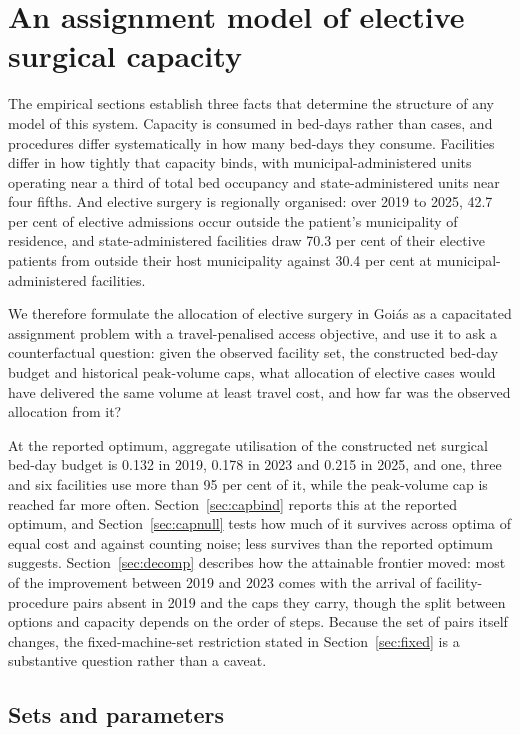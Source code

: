 \section{An assignment model of elective surgical capacity}
\label{sec:model}

The empirical sections establish three facts that determine the structure of any
model of this system. Capacity is consumed in bed-days rather than cases, and
procedures differ systematically in how many bed-days they consume. Facilities
differ in how tightly that capacity binds, with municipal-administered units
operating near a third of total bed occupancy and state-administered units near
four fifths. And elective surgery is regionally organised: over 2019 to 2025, 42.7 per cent of elective admissions occur outside the patient's municipality of residence, and
state-administered facilities draw 70.3 per cent of their elective patients from
outside their host municipality against 30.4 per cent at municipal-administered
facilities.

We therefore formulate the allocation of elective surgery in Goi\'as as a
capacitated assignment problem with a travel-penalised access objective, and use
it to ask a counterfactual question: given the observed facility set, the constructed bed-day budget and historical peak-volume caps, what allocation of elective cases would have
delivered the same volume at least travel cost, and how far was the observed
allocation from it?

At the reported optimum, aggregate utilisation of the constructed net surgical
bed-day budget is 0.132 in 2019, 0.178 in 2023 and 0.215 in 2025, and one, three
and six facilities use more than 95 per cent of it, while the peak-volume cap is
reached far more often. Section~\ref{sec:capbind} reports this at the reported
optimum, and Section~\ref{sec:capnull} tests how much of it survives across
optima of equal cost and against counting noise; less survives than the reported
optimum suggests. Section~\ref{sec:decomp} describes how the attainable frontier moved: most of the improvement between
2019 and 2023 comes with the arrival of facility-procedure pairs absent in 2019 and the caps they carry,
though the split between options and capacity depends on the order of steps. Because the set of pairs itself changes, the fixed-machine-set restriction stated in
Section~\ref{sec:fixed} is a substantive question rather than a caveat.

\subsection{Sets and parameters}
\label{sec:sets}

